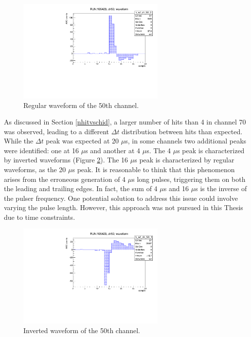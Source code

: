 \begin{figure}[!h]
  \centering
  \includegraphics[width=0.65\textwidth]{figures/pdf/wf_ch50_0.pdf}
  \caption{Regular waveform of the 50th channel.}
 \label{fig:normalwf}
\end{figure}

As discussed in Section \ref{nhitvschid}, a larger number of hits than 4 
in channel 70 was observed, 
leading to a different $\Delta t$ distribution between hits than expected. 
While the $\Delta t$ peak was expected at 20 $\mu$s, in some channels two 
additional peaks were identified: 
one at 16 $\mu$s and another at 4 $\mu$s. The 4 $\mu$s peak is 
characterized by inverted waveforms (Figure \ref{fig:inverted}). 
The 16 $\mu$s peak is characterized by regular waveforms, as the 20 $\mu$s peak.
It is reasonable to think that this phenomenon arises from the erroneous 
generation of 4 $\mu$s long pulses, 
triggering them on both the leading and trailing edges. In fact, 
the sum of 4 $\mu$s and 16 $\mu$s is the inverse of the pulser frequency. 
One potential solution to address this issue could involve varying the pulse length. 
However, this approach was not pursued in this Thesis due to time constraints.
\begin{figure}[!h]
  \centering
  \includegraphics[width=0.65\textwidth]{figures/pdf/wf_ch50_1.pdf}
  \caption{Inverted waveform of the 50th channel.}
 \label{fig:inverted}
\end{figure}
